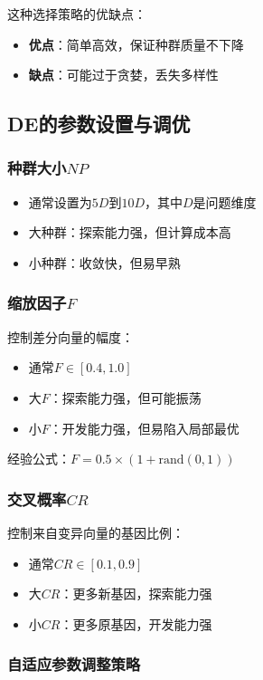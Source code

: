 这种选择策略的优缺点：
\begin{itemize}
    \item \textbf{优点}：简单高效，保证种群质量不下降
    \item \textbf{缺点}：可能过于贪婪，丢失多样性
\end{itemize}

\subsection{DE的参数设置与调优}

\subsubsection{种群大小$NP$}

\begin{itemize}
    \item 通常设置为$5D$到$10D$，其中$D$是问题维度
    \item 大种群：探索能力强，但计算成本高
    \item 小种群：收敛快，但易早熟
\end{itemize}

\subsubsection{缩放因子$F$}

控制差分向量的幅度：
\begin{itemize}
    \item 通常$F \in [0.4, 1.0]$
    \item 大$F$：探索能力强，但可能振荡
    \item 小$F$：开发能力强，但易陷入局部最优
\end{itemize}

经验公式：$F = 0.5 \times (1 + \text{rand}(0,1))$

\subsubsection{交叉概率$CR$}

控制来自变异向量的基因比例：
\begin{itemize}
    \item 通常$CR \in [0.1, 0.9]$
    \item 大$CR$：更多新基因，探索能力强
    \item 小$CR$：更多原基因，开发能力强
\end{itemize}

\subsubsection{自适应参数调整策略}


